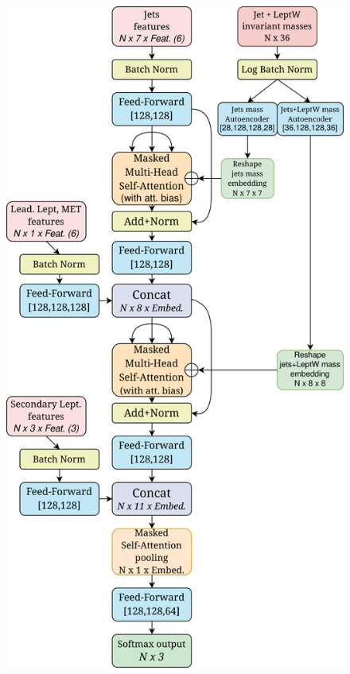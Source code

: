 \begin{figure}[H]
    \centering
    \includegraphics[height=0.78\textheight]{fig//chap09-sigback/SBANet.png}
    \label{fig:SBANet}


\end{figure}
